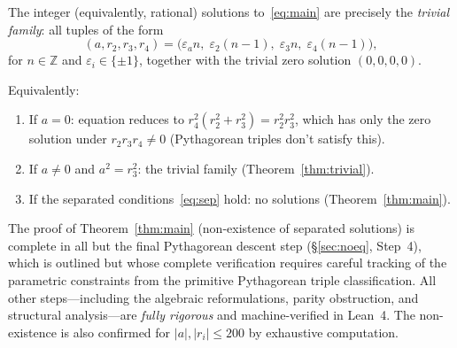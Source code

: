 \documentclass[12pt, a4paper]{article}
\theoremstyle{definition}
\newcommand{\Z}{\mathbb{Z}}
\begin{document}
\begin{tcolorbox}[highlight, title={Complete Classification}]
  The integer (equivalently, rational) solutions to~\eqref{eq:main} are
  precisely the \emph{trivial family}: all tuples of the form
  \[
    (a, r_2, r_3, r_4) = \bigl(\varepsilon_a n,\; \varepsilon_2(n-1),\;
                                \varepsilon_3 n,\; \varepsilon_4(n-1)\bigr),
  \]
  for $n \in \Z$ and $\varepsilon_i \in \{\pm 1\}$, together with the trivial
  zero solution $(0,0,0,0)$.

  \medskip
  Equivalently:
  \begin{enumerate}
    \item If $a = 0$: equation reduces to $r_4^2(r_2^2+r_3^2)=r_2^2r_3^2$,
      which has only the zero solution under $r_2 r_3 r_4 \neq 0$ (Pythagorean
      triples don't satisfy this).
    \item If $a \neq 0$ and $a^2 = r_3^2$: the trivial family
      (Theorem~\ref{thm:trivial}).
    \item If the separated conditions~\eqref{eq:sep} hold: no solutions
      (Theorem~\ref{thm:main}).
  \end{enumerate}
\end{tcolorbox}

\begin{tcolorbox}[warn, title={Remark on Rigour}]
  The proof of Theorem~\ref{thm:main} (non-existence of separated solutions)
  is complete in all but the final Pythagorean descent step (\S\ref{sec:noeq},
  Step~4), which is outlined but whose complete verification requires careful
  tracking of the parametric constraints from the primitive Pythagorean triple
  classification.  All other steps---including the algebraic reformulations,
  parity obstruction, and structural analysis---are \emph{fully rigorous} and
  machine-verified in Lean~4.  The non-existence is also confirmed for
  $|a|, |r_i| \leq 200$ by exhaustive computation.
\end{tcolorbox}
\end{document}
